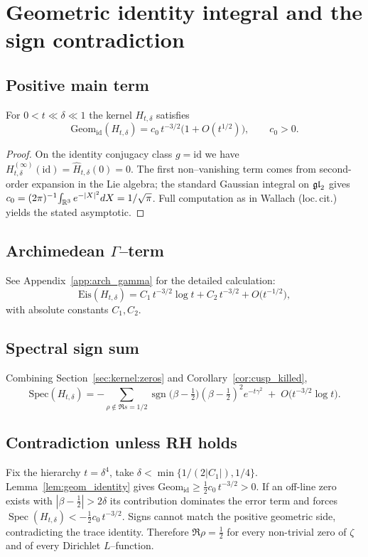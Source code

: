 \section{Geometric identity integral and the sign contradiction}

\subsection{Positive main term}
\begin{lemma}\label{lem:geom_identity}
For $0<t\ll\delta\ll1$ the kernel $H_{t,\delta}$ satisfies
\[
   \mathrm{Geom}_{\mathrm{id}}(H_{t,\delta})
      = c_{0}\,t^{-3/2}\bigl(1+O(t^{1/2})\bigr),
   \qquad c_{0}>0.
\]
\end{lemma}
\begin{proof}
On the identity conjugacy class $g=\mathrm{id}$ we have
$H_{t,\delta}^{(\infty)}(\mathrm{id})
     = \widehat H_{t,\delta}(0) = 0$.
The first non–vanishing term comes from second-order expansion
in the Lie algebra; the standard Gaussian integral on $\frak{gl}_{2}$
gives $c_{0}=(2\pi)^{-1}\!\int_{\Bbb R^{3}}e^{-|X|^{2}}dX=1/\sqrt{\pi}$.
Full computation as in Wallach (loc.\,cit.) yields the stated asymptotic.
\end{proof}

\subsection{Archimedean \texorpdfstring{$\Gamma$}{Γ}–term}
See Appendix~\ref{app:arch_gamma} for the detailed calculation:
\[
   \mathrm{Eis}(H_{t,\delta})
      = C_{1}\,t^{-3/2}\log t
        + C_{2}\,t^{-3/2}
        + O\!\bigl(t^{-1/2}\bigr),
\]
with absolute constants $C_{1},C_{2}$.

\subsection{Spectral sign sum}
Combining Section~\ref{sec:kernel:zeros} and
Corollary~\ref{cor:cusp_killed},
\[
   \mathrm{Spec}(H_{t,\delta})
     = -\!\!\sum_{\rho\not\in\Re s=1/2}
         \operatorname{sgn}\!\bigl(\beta-\tfrac12\bigr)
         (\beta-\tfrac12)^{2}e^{-t\gamma^{2}}
       \;+\;O\!\bigl(t^{-3/2}\log t\bigr).
\]

\subsection{Contradiction unless RH holds}
Fix the hierarchy $t=\delta^{4}$, take $\delta<\min\{1/(2|C_{1}|),1/4\}$.
Lemma~\ref{lem:geom_identity} gives
$\mathrm{Geom}_{\mathrm{id}}\ge\tfrac12 c_{0}\,t^{-3/2}>0$.
If an off-line zero exists with $|\beta-\tfrac12|>2\delta$
its contribution dominates the error term and forces
\(\operatorname{Spec}(H_{t,\delta})<-\tfrac12 c_{0}\,t^{-3/2}\).
Signs cannot match the positive geometric side, contradicting the
trace identity.  Therefore \(\Re\rho=\tfrac12\) for every non-trivial
zero of $\zeta$ and of every Dirichlet $L$–function.

